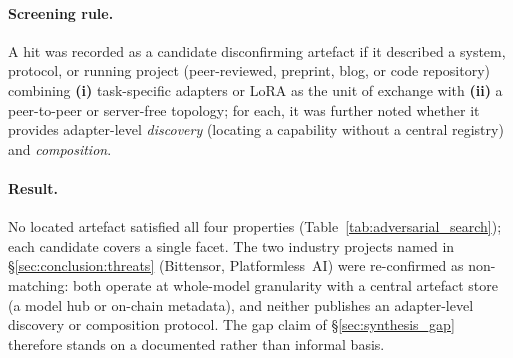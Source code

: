 \paragraph{Screening rule.} A hit was recorded as a candidate disconfirming
artefact if it described a system, protocol, or running project (peer-reviewed,
preprint, blog, or code repository) combining \textbf{(i)} task-specific
adapters or LoRA as the unit of exchange with \textbf{(ii)} a peer-to-peer or
server-free topology; for each, it was further noted whether it provides
adapter-level \emph{discovery} (locating a capability without a central
registry) and \emph{composition}.

\paragraph{Result.} No located artefact satisfied all four properties
(Table~\ref{tab:adversarial_search}); each candidate covers a single facet. The
two industry projects named in \S\ref{sec:conclusion:threats} (Bittensor,
Platformless~AI) were re-confirmed as non-matching: both operate at whole-model
granularity with a central artefact store (a model hub or on-chain metadata),
and neither publishes an adapter-level discovery or composition protocol. The
gap claim of \S\ref{sec:synthesis_gap} therefore stands on a documented rather
than informal basis.

